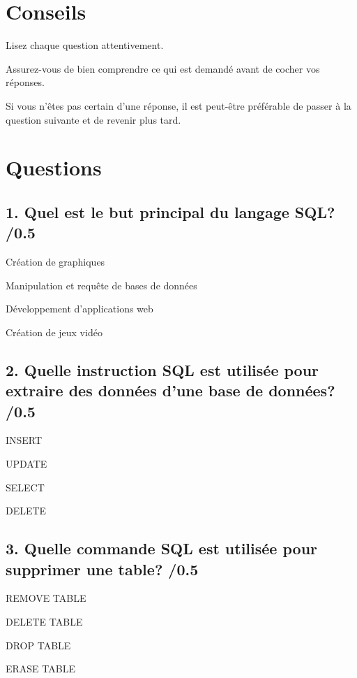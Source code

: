 \documentclass[12pt,a4paper]{article}
\begin{document}
\begin{flushleft}
\section*{Conseils}

Lisez chaque question attentivement.

Assurez-vous de bien comprendre ce qui est demandé avant de cocher vos réponses.

Si vous n'êtes pas certain d'une réponse, il est peut-être préférable de passer à la question suivante et de revenir plus tard.

\newpage
\section*{Questions}

\subsection*{1. Quel est le but principal du langage SQL? /0.5}
\begin{choices}
    \item Création de graphiques
    \item Manipulation et requête de bases de données
    \item Développement d'applications web
    \item Création de jeux vidéo
\end{choices}

\subsection*{2. Quelle instruction SQL est utilisée pour extraire des données d'une base de données? /0.5}
\begin{choices}
    \item INSERT
    \item UPDATE
    \item SELECT
    \item DELETE
\end{choices}

\subsection*{3. Quelle commande SQL est utilisée pour supprimer une table? /0.5}
\begin{choices}
    \item REMOVE TABLE
    \item DELETE TABLE
    \item DROP TABLE
    \item ERASE TABLE
\end{choices}


\end{flushleft}
\end{document}
